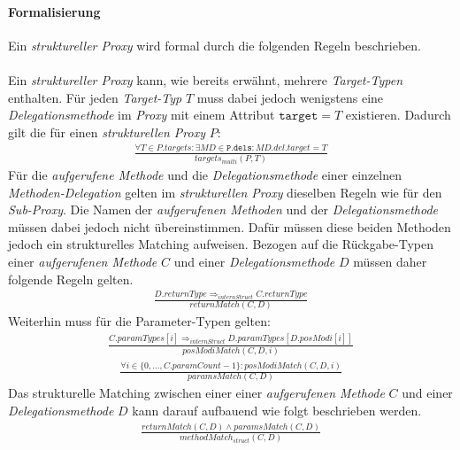 \paragraph{Formalisierung}
Ein \emph{struktureller Proxy} wird formal durch die folgenden Regeln beschrieben.
\\\\
Ein \emph{struktureller Proxy} kann, wie bereits erwähnt, mehrere \emph{Target-Typen} enthalten.
Für jeden \emph{Target-Typ} $T$ muss dabei jedoch wenigstens eine \emph{Delegationsmethode} im \emph{Proxy} mit einem Attribut $\texttt{target} = T$ existieren. Dadurch gilt die für einen \emph{strukturellen Proxy} $P$:
\begin{gather*}
\frac{\forall \mathit{T} \in \mathit{P.targets}:\exists \mathit{MD} \in \mathtt{P.dels}:\mathit{MD.del.target} = T}{\mathit{targets_{multi}(P, T)}}
\end{gather*}
\noindent
Für die \emph{aufgerufene Methode} und die \emph{Delegationsmethode} einer einzelnen \emph{Methoden-Delegation} gelten im \emph{strukturellen Proxy} dieselben Regeln wie für den \emph{Sub-Proxy}. Die Namen der \emph{aufgerufenen Methoden} und der \emph{Delegationsmethode} müssen dabei jedoch nicht übereinstimmen. Dafür müssen diese beiden Methoden jedoch ein strukturelles Matching aufweisen. Bezogen auf die Rückgabe-Typen einer \emph{aufgerufenen Methode} $\mathit{C}$ und einer \emph{Delegationsmethode} $\mathit{D}$ müssen daher folgende Regeln gelten.
\begin{gather*}
\frac{\mathit{D.returnType} \Rightarrow_{internStruct} \mathit{C.returnType}}{\mathit{returnMatch(C,D)}}
\end{gather*} 
\noindent
Weiterhin muss für die Parameter-Typen gelten:
\begin{gather*}
\frac{
\mathit{C.paramTypes}[i] \Rightarrow_{internStruct} \mathit{D.paramTypes}[\mathit{D.posModi}[i]]}{\mathit{posModiMatch(C,D,i)}}
\end{gather*} 
\begin{gather*}
\frac{\forall \mathit{i} \in \{0,...,\mathit{C.paramCount}-1\}: \mathit{posModiMatch(C,D,i)}
}{\mathit{paramsMatch(C,D)}}
\end{gather*} 
\noindent
Das strukturelle Matching zwischen einer einer \emph{aufgerufenen Methode} $C$ und einer \emph{Delegationsmethode} $D$ kann darauf aufbauend wie folgt beschrieben werden.
\begin{gather*}
\frac{\mathit{returnMatch(C,D) \wedge \mathit{paramsMatch(C,D)}}}
{\mathit{methodMatch_{struct}(C,D)}}
\end{gather*}
